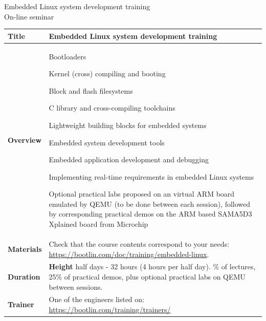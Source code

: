 \documentclass[a4paper,12pt,obeyspaces,spaces,hyphens]{article}
\begin{document}
\thispagestyle{fancy}

\setlength{\arrayrulewidth}{0.8pt}

\begin{center}
\LARGE
Embedded Linux system development training\\
\large
On-line seminar
\end{center}
\vspace{1cm}

\small
{}

 {
  \begin{tabularx}{\textwidth}{|g|h|}
    {\bf Title} & {\bf Embedded Linux system development training} \\
    \hline

    {\bf Overview} &
    Bootloaders \par
    Kernel (cross) compiling and booting \par
    Block and flash filesystems \par
    C library and cross-compiling toolchains \par
    Lightweight building blocks for embedded systems \par
    Embedded system development tools \par
    Embedded application development and debugging \par
    Implementing real-time requirements in embedded Linux systems \par
    Optional practical labs proposed on an virtual ARM board
    emulated by QEMU (to be done between each session),
    followed by corresponding practical demos on the ARM based SAMA5D3
    Xplained board from Microchip \\
    \hline
    {\bf Materials} &
    Check that the course contents correspond to your needs:
    \newline \url{https://bootlin.com/doc/training/embedded-linux}. \\
    \hline

    {\bf Duration} & {\bf Height } half days - 32 hours (4 hours per half day).
    \% of lectures, 25\% of practical demos, plus optional
    practical labs on QEMU between sessions. \\
    \hline

    {\bf Trainer} & One of the engineers listed on:
    \newline \url{https://bootlin.com/training/trainers/}\\
    \hline


\end{tabularx}}
\end{document}
